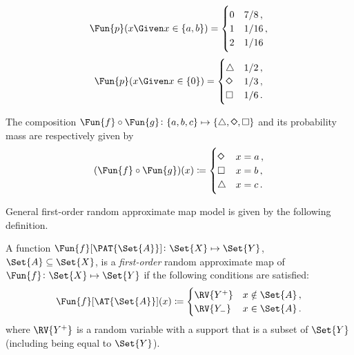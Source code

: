\documentclass[ ../main.tex]{subfiles}
\begin{document}
{\begin{example}
	\begin{multicols}{2}
		\noindent
		\begin{equation}
		\Fun{p}(x \Given x \in \{a,b\}) =
		\begin{cases}
		0	&	7/8\,,\\
		1	&	1/16\,,\\
		2	&	1/16
		\end{cases}
		\end{equation}
		\begin{equation}
		\Fun{p}(x \Given x \in \{0\}) =
		\begin{cases}
		\triangle			&	1/2\,,\\
		\mathlg{\diamond}	&	1/3\,,\\
		\square				&	1/6\,.
		\end{cases}
		\end{equation}
	\end{multicols}

	
	The composition $\Fun{f} \circ \Fun{g} \colon \{a,b,c\} \mapsto \{\triangle,\mathlg{\diamond},\square\}$ and its probability mass are respectively given by
	\begin{equation}
	(\Fun{f} \circ \Fun{g})(x) \coloneqq
	\begin{cases}
	\mathlg{\diamond}	&	x = a\,,\\
	\square				&	x = b\,,\\
	\triangle			&	x = c\,.
	\end{cases}
	\end{equation}
	
\end{example}
}









General first-order random approximate map model is given by the following definition.
\begin{definition}
A function $\Fun{f}[\PAT{\Set{A}}] \colon \Set{X} \mapsto \Set{Y}$, $\Set{A} \subseteq \Set{X}$, is a \emph{first-order} random approximate map of $\Fun{f} \colon \Set{X} \mapsto \Set{Y}$ if the following conditions are satisfied:
\begin{equation}
\Fun{f}[\AT{\Set{A}}](x) \coloneqq
	\begin{cases}
		\RV{Y^{+}}		&	x \notin \Set{A}\,,\\
		\RV{Y_{-}}		&	x \in \Set{A}\,.
	\end{cases}
\end{equation}
where $\RV{Y^{+}}$ is a random variable with a support that is a subset of $\Set{Y}$ (including being equal to $\Set{Y}$).
\end{definition}
\end{document}
